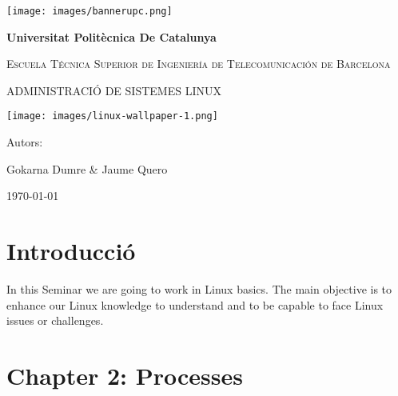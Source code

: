 \documentclass[12pt, titlepage,]{article}
\begin{document}
    \begin{titlepage}
    \centering
    {\texttt{[image: images/bannerupc.png]}\par}
    {\bfseries\LARGE Universitat Politècnica De Catalunya\par}
    \vspace{1cm} %
    {\scshape\large Escuela Técnica Superior de Ingeniería de Telecomunicación de Barcelona\par}
    \vspace{0.7cm} %
    {\scshape\Huge ADMINISTRACIÓ DE SISTEMES LINUX \par}
    \vspace{0.3cm}
    {\texttt{[image: images/linux-wallpaper-1.png]}\par}
    \vfill
    {\Large Autors: \\}
    {\Large Gokarna Dumre \& Jaume Quero \par}
    \vspace{1cm}
    {\small{\today}}
    \end{titlepage}

    \tableofcontents
     \clearpage


\section{Introducció}
\large In this Seminar we are going to work in Linux basics. The main objective is to enhance our Linux knowledge to understand and to be capable to face Linux issues or challenges.
\par

\clearpage





\section{Chapter 2: Processes}
\end{document}
